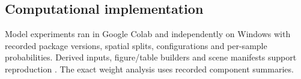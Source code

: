 \subsection{Computational implementation}
Model experiments ran in Google Colab and independently on Windows with recorded package versions, spatial splits, configurations and per-sample probabilities. Derived inputs, figure/table builders and scene manifests support reproduction \citep{wilson2017practices,nust2018reproducible}. The exact weight analysis uses recorded component summaries.

